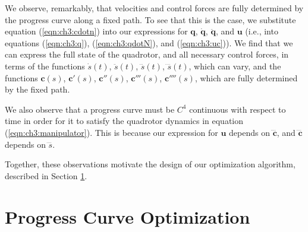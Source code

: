 We observe, remarkably, that velocities and control forces are fully determined by the progress curve along a fixed path.
To see that this is the case, we substitute equation (\ref{eqn:ch3:cdotn}) into our expressions for $\mathbf{q}$, $\dot{\mathbf{q}}$, $\ddot{\mathbf{q}}$, and $\mathbf{u}$ (i.e., into equations (\ref{eqn:ch3:q}), (\ref{eqn:ch3:qdotN}), and (\ref{eqn:ch3:uc})).
We find that we can express the full state of the quadrotor, and all necessary control forces, in terms of the functions  $\dot{s}(t)$, $\ddot{s}(t)$, $\dddot{s}(t)$, $\ddddot{s}(t)$, which can vary, and the functions $\mathbf{c}(s)$, $\mathbf{c}'(s)$, $\mathbf{c}''(s)$, $\mathbf{c}'''(s)$, $\mathbf{c}''''(s)$, which are fully determined by the fixed path.

We also observe that a progress curve must be $C^4$ continuous with respect to time in order for it to satisfy the quadrotor dynamics in equation (\ref{eqn:ch3:manipulator}).
This is because our expression for $\mathbf{u}$ depends on $\ddddot{\mathbf{c}}$, and $\ddddot{\mathbf{c}}$ depends on $\ddddot{s}$.

Together, these observations motivate the design of our optimization algorithm, described in Section \ref{sec:ch3:optimization}.



\section{Progress Curve Optimization}
\label{sec:ch3:optimization}

